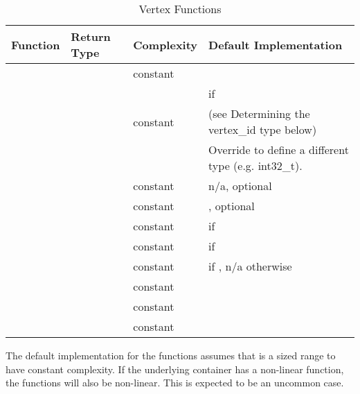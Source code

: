 \begin{table}[h!]
\begin{center}
\resizebox{\textwidth}{!}
{\begin{tabular}{l l p{1.5cm} L{7.0cm}}
\hline
    \textbf{Function} & \textbf{Return Type} & \textbf{Complexity} & \textbf{Default Implementation} \\
\hline
     &  & constant &  \\
    & & & if   \\
     &  & constant & (see Determining the vertex\_id type below) \\
    & & & Override to define a different  type (e.g. int32\_t). \\
     &  & constant & n/a, optional \\
     &  & constant & , optional \\
     &  & constant &  if  \\
     &  & constant &  if  \\
     &  & constant &  if , n/a otherwise \\
     &  & constant &  \\
\hdashline
     &  & constant &  \\
     &  & constant &  \\
\hline
\hline
\end{tabular}}
\caption{Vertex Functions}
\label{tab:vertex_func}
\end{center}
\end{table}

The default implementation for the  functions assumes that  is a sized range
to have constant complexity. If the underlying container has a non-linear  function, the  functions will 
also be non-linear. This is expected to be an uncommon case.

